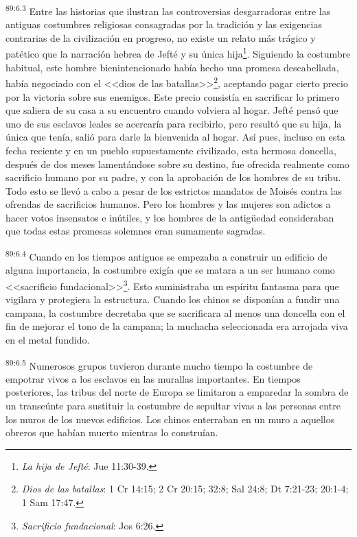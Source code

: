 \documentclass[twoside, 11pt]{book}
\begin{document}
\par
\textsuperscript{89:6.3} Entre las historias que ilustran las controversias desgarradoras entre las antiguas costumbres religiosas consagradas por la tradición y las exigencias contrarias de la civilización en progreso, no existe un relato más trágico y patético que la narración hebrea de Jefté y su única hija\footnote{\textit{La hija de Jefté}: Jue 11:30-39.}. Siguiendo la costumbre habitual, este hombre bienintencionado había hecho una promesa descabellada, había negociado con el <<dios de las batallas>>\footnote{\textit{Dios de las batallas}: 1 Cr 14:15; 2 Cr 20:15; 32:8; Sal 24:8; Dt 7:21-23; 20:1-4; 1 Sam 17:47.}, aceptando pagar cierto precio por la victoria sobre sus enemigos. Este precio consistía en sacrificar lo primero que saliera de su casa a su encuentro cuando volviera al hogar. Jefté pensó que uno de sus esclavos leales se acercaría para recibirlo, pero resultó que su hija, la única que tenía, salió para darle la bienvenida al hogar. Así pues, incluso en esta fecha reciente y en un pueblo supuestamente civilizado, esta hermosa doncella, después de dos meses lamentándose sobre su destino, fue ofrecida realmente como sacrificio humano por su padre, y con la aprobación de los hombres de su tribu. Todo esto se llevó a cabo a pesar de los estrictos mandatos de Moisés contra las ofrendas de sacrificios humanos. Pero los hombres y las mujeres son adictos a hacer votos insensatos e inútiles, y los hombres de la antig\"uedad consideraban que todas estas promesas solemnes eran sumamente sagradas.

\par
\textsuperscript{89:6.4} Cuando en los tiempos antiguos se empezaba a construir un edificio de alguna importancia, la costumbre exigía que se matara a un ser humano como <<sacrificio fundacional>>\footnote{\textit{Sacrificio fundacional}: Jos 6:26.}. Esto suministraba un espíritu fantasma para que vigilara y protegiera la estructura. Cuando los chinos se disponían a fundir una campana, la costumbre decretaba que se sacrificara al menos una doncella con el fin de mejorar el tono de la campana; la muchacha seleccionada era arrojada viva en el metal fundido.

\par
\textsuperscript{89:6.5} Numerosos grupos tuvieron durante mucho tiempo la costumbre de empotrar vivos a los esclavos en las murallas importantes. En tiempos posteriores, las tribus del norte de Europa se limitaron a emparedar la sombra de un transeúnte para sustituir la costumbre de sepultar vivas a las personas entre los muros de los nuevos edificios. Los chinos enterraban en un muro a aquellos obreros que habían muerto mientras lo construían.
\end{document}
